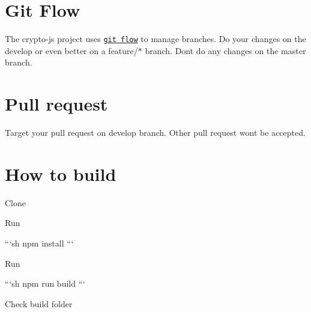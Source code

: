 \section*{Git Flow}

The crypto-\/js project uses \href{https://github.com/nvie/gitflow}{\tt git flow} to manage branches. Do your changes on the {\ttfamily develop} or even better on a {\ttfamily feature/$\ast$} branch. Don\textquotesingle{}t do any changes on the {\ttfamily master} branch.

\section*{Pull request}

Target your pull request on {\ttfamily develop} branch. Other pull request won\textquotesingle{}t be accepted.

\section*{How to build}


\begin{DoxyEnumerate}
\item Clone
\item Run

```sh npm install ```
\item Run

```sh npm run build ```
\item Check {\ttfamily build} folder 
\end{DoxyEnumerate}